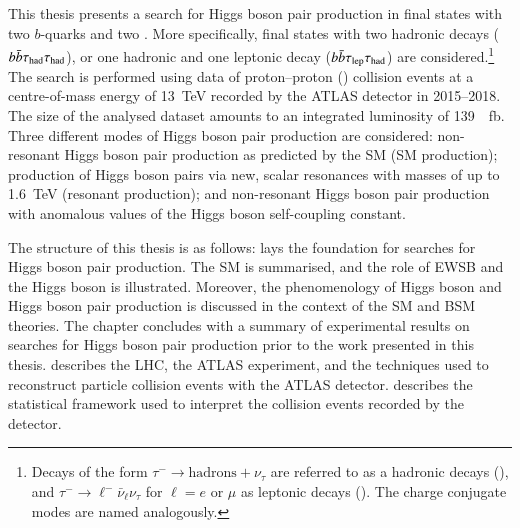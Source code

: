 This thesis presents a search for Higgs boson pair production in final states
with two $b$-quarks and two \tauleptons. More specifically, final states with
two hadronic \taulepton decays ($b\bar{b}\tau_{\text{had}}\tau_{\text{had}}$), or one hadronic and one
leptonic \taulepton decay ($b\bar{b}\tau_{\text{lep}}\tau_{\text{had}}$) are considered.\footnote{Decays of
  the form $\tau^- \to \text{hadrons} + \nu_\tau$ are referred to as a hadronic
  \taulepton decays (\tauhad), and $\tau^- \to \ell^- \bar{\nu}_\ell \nu_\tau$
  for $\ell = e$ or $\mu$ as leptonic \taulepton decays (\taulep). The charge
  conjugate modes are named analogously.} The search is performed using data of
proton--proton (\pp) collision events at a centre-of-mass energy of
\SI{13}{\TeV} recorded by the ATLAS detector in 2015--2018. The size of the
analysed dataset amounts to an integrated luminosity of
\SI{139}{\per\femto\barn}. Three different modes of Higgs boson pair production
are considered: non-resonant Higgs boson pair production as predicted by the SM
(SM \HH production); production of Higgs boson pairs via new, scalar resonances
with masses of up to \SI{1.6}{\TeV} (resonant \HH production); and non-resonant
Higgs boson pair production with anomalous values of the Higgs boson
self-coupling constant.

The structure of this thesis is as follows:  lays the
foundation for searches for Higgs boson pair production. The SM is summarised,
and the role of EWSB and the Higgs boson is illustrated. Moreover, the
phenomenology of Higgs boson and Higgs boson pair production is discussed in the
context of the SM and BSM theories. The chapter concludes with a summary of
experimental results on searches for Higgs boson pair production prior to the
work presented in this thesis.   describes the LHC, the
ATLAS experiment, and the techniques used to reconstruct particle collision
events with the ATLAS detector.  describes the
statistical framework used to interpret the collision events recorded by the
detector.

